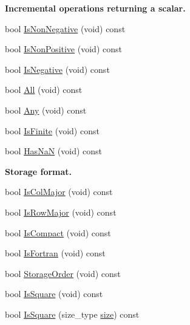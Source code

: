 \begin{Indent}{\bf Incremental operations returning a scalar.}
\begin{DoxyCompactItemize}
bool \hyperlink{classvct_dynamic_const_matrix_base_a781a40222ec60af886e5b0dc4b768bdc}{Is\-Non\-Negative} (void) const 
\item 
bool \hyperlink{classvct_dynamic_const_matrix_base_aece7c6ee08d3d9096b047dd76652a275}{Is\-Non\-Positive} (void) const 
\item 
bool \hyperlink{classvct_dynamic_const_matrix_base_a35aead8228fd239ea3b00802bdb5d95d}{Is\-Negative} (void) const 
\item 
bool \hyperlink{classvct_dynamic_const_matrix_base_a13617153241ba117e3585100211e9a0c}{All} (void) const 
\item 
bool \hyperlink{classvct_dynamic_const_matrix_base_a6a0a1c4a4e8119f62f97b246f5ce561d}{Any} (void) const 
\item 
bool \hyperlink{classvct_dynamic_const_matrix_base_a265590c5faf2d7ebc433a0d6aadfec91}{Is\-Finite} (void) const 
\item 
bool \hyperlink{classvct_dynamic_const_matrix_base_adf2612e64481a697ae8a9fc78e2e07f2}{Has\-Na\-N} (void) const 
\end{DoxyCompactItemize}
\end{Indent}
\begin{Indent}{\bf Storage format.}\par
\begin{DoxyCompactItemize}
\item 
bool \hyperlink{classvct_dynamic_const_matrix_base_a1945a7e96b8b050638207fc3da099a57}{Is\-Col\-Major} (void) const 
\item 
bool \hyperlink{classvct_dynamic_const_matrix_base_a8683251574604778a9e3c147d33b4539}{Is\-Row\-Major} (void) const 
\item 
bool \hyperlink{classvct_dynamic_const_matrix_base_ac061c634b765bbd24e2772375c4578a1}{Is\-Compact} (void) const 
\item 
bool \hyperlink{classvct_dynamic_const_matrix_base_aac5f19015b4888f760f99daa4bac199c}{Is\-Fortran} (void) const 
\item 
bool \hyperlink{classvct_dynamic_const_matrix_base_a064405adc7355f3fc8539f01ed4ea6d4}{Storage\-Order} (void) const 
\item 
bool \hyperlink{classvct_dynamic_const_matrix_base_ac2d09b31112bdc2535fec493232015e4}{Is\-Square} (void) const 
\item 
bool \hyperlink{classvct_dynamic_const_matrix_base_ad74a461c722bf9c2e1b9aaa85049f327}{Is\-Square} (size\-\_\-type \hyperlink{classvct_dynamic_const_matrix_base_ab9d484f83471aee6512ea614aa54bd0b}{size}) const 
\end{DoxyCompactItemize}
\end{Indent}
